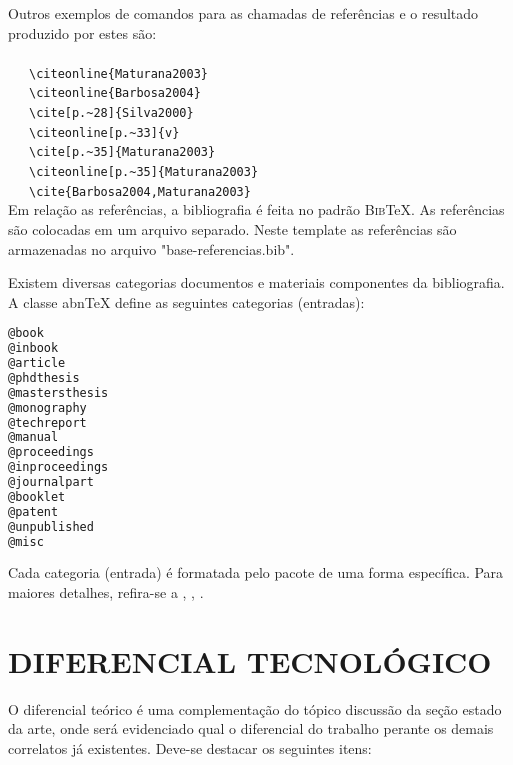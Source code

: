 Outros exemplos de comandos para as chamadas de referências e o resultado produzido por estes são:\\
\\ \ \ \  \verb|\citeonline{Maturana2003}|\\
 \ \ \   \verb|\citeonline{Barbosa2004}|\\
\cite[p.~28]{Silva2000} \ \ \  \verb|\cite[p.~28]{Silva2000}|\\
 \ \ \   \verb|\citeonline[p.~33]{v}|\\
\cite[p.~35]{Maturana2003} \ \ \   \verb|\cite[p.~35]{Maturana2003}|\\
 \ \ \   \verb|\citeonline[p.~35]{Maturana2003}|\\
\cite{Barbosa2004,Maturana2003} \ \ \   \verb|\cite{Barbosa2004,Maturana2003}|\\

Em relação as referências, a bibliografia é feita no padrão \textsc{Bib}\TeX{}. As referências são colocadas em um arquivo separado. Neste template as referências são armazenadas no arquivo "base-referencias.bib".

Existem diversas categorias documentos e materiais componentes da bibliografia. A classe abn\TeX{} define as seguintes categorias (entradas):

\begin{lstlisting}[language=tex]
@book
@inbook
@article
@phdthesis
@mastersthesis
@monography
@techreport
@manual
@proceedings
@inproceedings
@journalpart
@booklet
@patent
@unpublished
@misc
\end{lstlisting}

Cada categoria (entrada) é formatada pelo pacote  de uma forma específica. Para maiores detalhes, refira-se a , , .

\section{DIFERENCIAL TECNOLÓGICO}
\label{sec:diferencial}
O diferencial teórico é uma complementação do tópico discussão da seção estado da arte, onde será evidenciado qual o diferencial do trabalho perante os demais correlatos já existentes. Deve-se destacar os seguintes itens:

